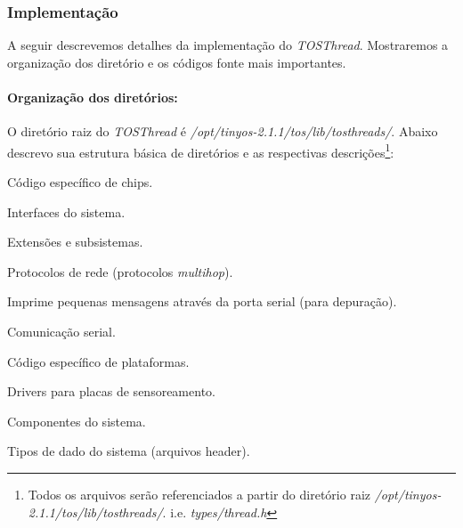 \documentclass[a4paper, 10pt]{article}
\begin{document}
\subsubsection{Implementação}
A seguir descrevemos detalhes da implementação do \textit{TOSThread}. Mostraremos a organização dos diretório e os
códigos fonte mais importantes.

\paragraph{Organização dos diretórios:}
O diretório raiz do \textit{TOSThread} é \textit{/opt/tinyos-2.1.1/tos/lib/tosthreads/}.
Abaixo descrevo sua estrutura básica de diretórios e as respectivas descrições\footnote{Todos os arquivos serão referenciados a partir do diretório
raiz \textit{/opt/tinyos-2.1.1/tos/lib/tosthreads/}. i.e. \textit{types/thread.h}}:
\begin{description}
\setlength{\itemsep}{0.2pt}
\setlength{\parskip}{0pt}
\setlength{\parsep}{0pt}
    \item[chips:] Código específico de chips.
    \item[interfaces:] Interfaces do sistema.
    \item[lib:] Extensões e subsistemas.
        \begin{description}
        \setlength{\itemsep}{0.2pt}
        \setlength{\parskip}{0pt}
        \setlength{\parsep}{0pt}
            \item[net:] Protocolos de rede (protocolos \textit{multihop}).
            \item[printf:] Imprime pequenas mensagens através da porta serial (para depuração).
            \item[serial:] Comunicação serial.
        \end{description}
    \item[platforms:] Código específico de plataformas.
    \item[sensorboards:] Drivers para placas de sensoreamento.
    \item[system:] Componentes do sistema.
    \item[types:] Tipos de dado do sistema (arquivos header).
\end{description}
\end{document}

